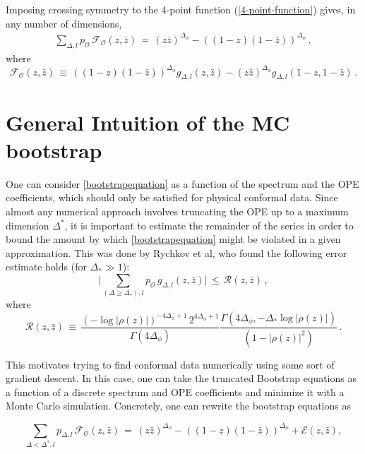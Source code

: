 \documentclass[letterpaper]{article}
\numberwithin{equation}{section}
\begin{document}
Imposing crossing symmetry to the 4-point function (\ref{4-point-function}) gives, in any number of dimensions, 
\begin{align}
\label{bootstrapequation}
\sum_{\Delta ,l } p_{\mathcal{O}} \, \mathcal{F}_{\mathcal{O}}(z, \bar z) \, = \, (z \bar z)^{\Delta_\phi} - ((1-z)(1-\bar z))^{\Delta_\phi} \, ,
\end{align} 
where
\begin{equation}
\mathcal{F}_{\mathcal{O}}(z, \bar z) \, \equiv \, ((1-z)(1-\bar z))^{\Delta_\phi} g_{\Delta,l}(z,\bar z)- (z \bar z)^{\Delta_\phi} g_{\Delta,l}(1-z,1-\bar z) \,.
\end{equation}


\section{General Intuition of the MC bootstrap}
One can consider \ref{bootstrapequation} as a function of the spectrum and the
OPE coefficients, which should only be satisfied for physical conformal data.
Since almost any numerical approach involves truncating the OPE up to a maximum
dimension $\Delta^*$, it is important to estimate the remainder of the series in
order to bound the amount by which \ref{bootstrapequation} might be violated in
a given approximation. This was done by Rychkov et al,
who found the following error estimate holds (for $\Delta_*\gg 1$):
\begin{equation}
\Big|\sum_{(\Delta\geq \Delta_*),l}p_{\mathcal{O}} \, g_{\Delta,l}(z,\bar z)\Big| \, \leq \, \mathcal{R}(z,\bar z)\,,
\label{finalest4}
\end{equation}
where
\begin{equation}
\mathcal{R}(z,\bar z) \,\equiv \, \frac{(-\log|\rho(z)|)^{-4\Delta_\phi+1} \, 2^{4\Delta_\phi+1}}{\Gamma(4\Delta_\phi)} \frac{\Gamma(4\Delta_\phi, - \Delta_* \log |\rho(z)|)}{{(1-|\rho(z)|^2)}}\,.
\label{finalest5a}
\end{equation}

This motivates trying to find conformal data numerically using some sort of
gradient descent. In this case, one can take the truncated 
Bootstrap equations as a function of a discrete spectrum and OPE coefficients 
and minimize it with a Monte Carlo
simulation. Concretely, one can rewrite the bootstrap equations as 

\begin{equation}
\label{bootstrapequation-bound}
\sum_{\Delta<\Delta^* ,l } p_{\mathcal{\Delta},l} \,
  \mathcal{F}_{\mathcal{O}}(z, \bar z) \, = \, (z \bar z)^{\Delta_\phi} -
  ((1-z)(1-\bar z))^{\Delta_\phi} + \mathcal{E}(z,\bar z),
\end{equation} 
\end{document}
